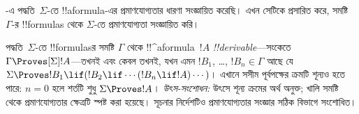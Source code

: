 \documentclass[../../../include/open-logic-section]{subfiles}
\begin{document}


-এ পদ্ধতি~$\Sigma$-তে !!a{formula}-এর প্রমাণযোগ্যতার ধারণা সংজ্ঞায়িত করেছি। এখন সেটিকে প্রসারিত করে, সমষ্টি~$\Gamma$-র !!{formula}s থেকে $\Sigma$-তে প্রমাণযোগ্যতা সংজ্ঞায়িত করি।

\begin{defn}
  পদ্ধতি~$\Sigma$-তে !!{formula}sর সমষ্টি $\Gamma$ থেকে !!^a{formula}~$!A$ \emph{!!{derivable}}—সংকেতে $\Gamma \Proves[\Sigma] !A$—তখনই এবং কেবল তখনই, যখন এমন $!B_1$, \dots, $!B_n \in \Gamma$ আছে যে $\Sigma \Proves !B_1 \lif (!B_2 \lif \cdots (!B_n \lif !A)
  \cdots)$।
  এখানে সসীম পূর্বপক্ষের ক্রমটি শূন্যও হতে পারে: $n=0$ হলে শর্তটি শুধু $\Sigma \Proves !A$। \emph{উৎস-সংশোধন:} উৎসে শূন্য ক্রমের অর্থ অনুক্ত; খালি সমষ্টি থেকে প্রমাণযোগ্যতার ক্ষেত্রটি স্পষ্ট করা হয়েছে। সূচনার নির্দেশটিও প্রমাণযোগ্যতার সংজ্ঞার সঠিক বিভাগে সংশোধিত।
  \end{defn}
\end{document}
